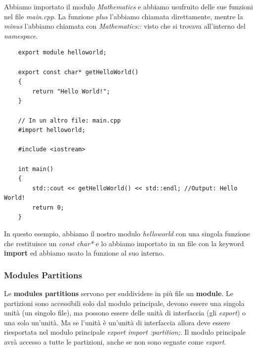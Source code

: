 \textsf{\small Abbiamo importato il modulo \emph{Mathematics} e abbiamo usufruito delle sue funzioni nel file \emph{main.cpp}. La funzione \emph{plus} l'abbiamo chiamata direttamente, mentre la \emph{minus} l'abbiamo chiamata con \emph{Mathematics::} visto che si trovava all'interno del \emph{namespace}.} \\

\begin{lstlisting}
	export module helloworld;
	
	export const char* getHelloWorld()
	{
		return "Hello World!";
	}

	// In un altro file: main.cpp
	#import helloworld;
	
	#include <iostream>
	
	int main()
	{
		std::cout << getHelloWorld() << std::endl; //Output: Hello World!
		return 0;
	}
\end{lstlisting}

\textsf{\small In questo esempio, abbiamo il nostro modulo \emph{helloworld} con una singola funzione che restituisce un \emph{const char*} e lo abbiamo importato in un file con la keyword \textbf{import} ed abbiamo usato la funzione al suo interno.} \\

\subsubsection{Modules Partitions}

\textsf{\small Le \textbf{modules partitions} servono per suddividere in più file un \textbf{module}. Le partizioni sono accessibili solo dal modulo principale, devono essere una singola unità (un singolo file), ma possono essere delle unità di interfaccia (gli \emph{export}) o una solo un'unità. Ma se l'unità è un'unità di interfaccia allora deve essere riesportata nel modulo principale \emph{export import :partition;}. Il modulo principale avrà accesso a tutte le partizioni, anche se non sono segnate come \emph{export}.} \\

